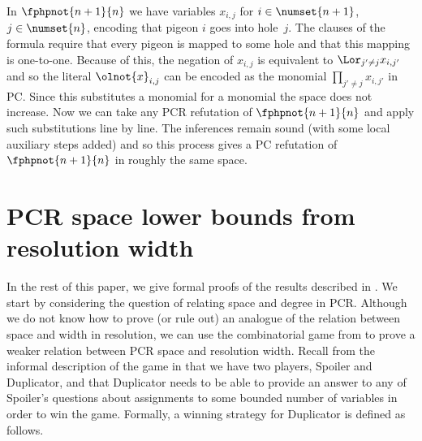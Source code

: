 \documentclass[11pt]{article}
\numberwithin{equation}{section}
\theoremstyle{definition}
\theoremstyle{plain}
\begin{document}
\begin{ourproof}[sketch]
  In
%
  $\fphpnot{n+1}{n}$
  we have variables
  $x_{i,j}$
  for
%
  $i \in \numset{n+1}$,
  $j \in \numset{n}$,
%
  encoding that pigeon $i$ goes into hole~$j$. The clauses of the
  formula require that every pigeon is mapped to some hole and that
  this mapping is one-to-one.
  Because of this, the negation of
  $x_{i,j}$
  is equivalent to 
  $\Lor_{j'\neq j} x_{i,j'}$
  and so the literal
  $\olnot{x}_{i,j}$
  can be encoded as the monomial
  $\prod_{j'\not=j} x_{i,j'}$
  in PC.
  Since this substitutes a monomial for a monomial the space does not
  increase. 
  Now we can take any PCR refutation of
  $\fphpnot{n+1}{n}$
%
  and apply such substitutions line by line.
  The inferences remain sound (with some local auxiliary steps added)
  and so this process gives a PC refutation of
  $\fphpnot{n+1}{n}$ 
%
  in roughly the same space.
%
%
%
%
%
%
%
%
%
\end{ourproof}

 
%
\section{PCR space lower bounds from resolution width}%
%
\label{sec:substitution}

In the rest of this paper, 
we give formal proofs of the results described in
.
We start by considering  the question of relating space and degree
in PCR\@. Although we do not know how to prove (or rule out) an analogue
of the relation between space and width in resolution, 
we can use the combinatorial game from
\cite{AD08CombinatoricalCharacterization} 
to prove a weaker relation between PCR space and resolution width. Recall
from the informal description of the game in
 that we have two players, Spoiler and
Duplicator, and that Duplicator needs to be able to provide an
answer to any of Spoiler's questions about assignments to some
bounded number of variables in order to win the game. Formally, a
winning strategy for Duplicator is defined as follows.
\end{document}

